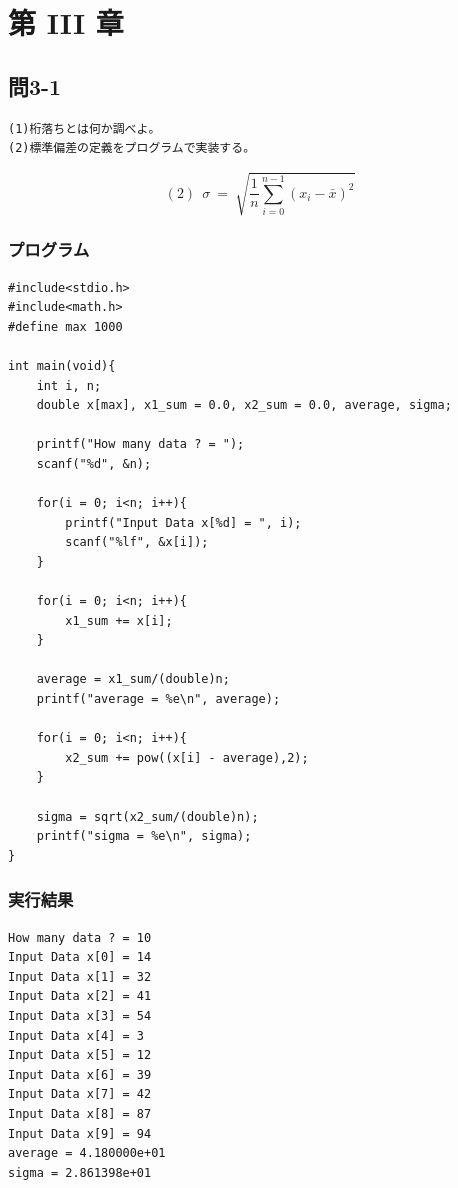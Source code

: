 \documentclass{jarticle}
\begin{document}
\section{第 III 章\\}
\subsection{問3-1\\}
\begin{verbatim}
(1)桁落ちとは何か調べよ。
(2)標準偏差の定義をプログラムで実装する。
\end{verbatim}
\[
(2) \ \ \sigma \ =\ \sqrt{\frac{1}{n}\sum_{i=0}^{n-1} (x_i - \bar{x})^2 }
\]

\subsubsection{プログラム\\}
\begin{breakbox}
\begin{verbatim}
#include<stdio.h>
#include<math.h>
#define max 1000

int main(void){
    int i, n;
    double x[max], x1_sum = 0.0, x2_sum = 0.0, average, sigma;

    printf("How many data ? = ");
    scanf("%d", &n);

    for(i = 0; i<n; i++){
        printf("Input Data x[%d] = ", i);
        scanf("%lf", &x[i]);
    }

    for(i = 0; i<n; i++){
        x1_sum += x[i];
    }

    average = x1_sum/(double)n;
    printf("average = %e\n", average);
    
    for(i = 0; i<n; i++){
        x2_sum += pow((x[i] - average),2);
    }

    sigma = sqrt(x2_sum/(double)n);
    printf("sigma = %e\n", sigma);
}
\end{verbatim}
\end{breakbox}
\subsubsection{実行結果\\}
\begin{breakbox}
\begin{verbatim}
How many data ? = 10
Input Data x[0] = 14
Input Data x[1] = 32
Input Data x[2] = 41
Input Data x[3] = 54
Input Data x[4] = 3
Input Data x[5] = 12
Input Data x[6] = 39
Input Data x[7] = 42
Input Data x[8] = 87
Input Data x[9] = 94
average = 4.180000e+01
sigma = 2.861398e+01
\end{verbatim}
\end{breakbox}
\end{document}
